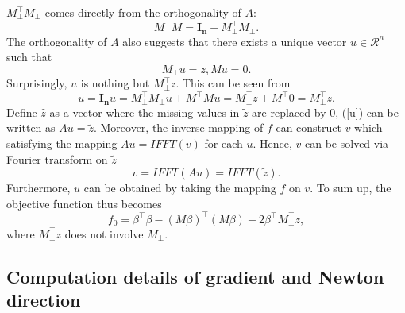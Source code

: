 \documentclass[final,onefignum,onetabnum]{siamart190516}
\begin{document}
$M_{\perp}^{\top}M_{\perp}$ comes directly from the orthogonality of $A$:
\begin{equation}
    M^{\top}M = \mathbf{I_n} -  M_{\perp}^{\top}M_{\perp}.
\end{equation}
The orthogonality of $A$ also suggests that there exists a unique vector $u\in \mathcal{R}^{n}$ such that
\begin{equation}\label{u}
    M_{\perp}u = z, Mu = 0.
\end{equation}
Surprisingly, $u$ is nothing but $M_{\perp}^{\top}z$. This can be seen from
\begin{equation}
    u = \mathbf{I_n}u = M_{\perp}^{\top} M_{\perp}u +  M^{\top}Mu = M_{\perp}^{\top}z + M^{\top}0 = M_{\perp}^{\top}z.
\end{equation}
Define $\widehat{z}$ as a vector where the missing values in $\widetilde{z}$ are replaced by 0, (\ref{u}) can be written as $Au = \widetilde{z}$. Moreover, the inverse mapping of $f$ can construct $v$ which satisfying the mapping $Au = IFFT(v)$ for each $u$. Hence, $v$ can be solved via Fourier transform on $\widetilde{z}$
\begin{equation}
    v = IFFT(Au) = IFFT(\widetilde{z}).
\end{equation}
Furthermore, $u$ can be obtained by taking the mapping $f$ on $v$. To sum up, the objective function thus becomes
\begin{equation}
    f_0 = \beta^{\top}\beta - (M\beta)^{\top}(M\beta) -2\beta^{\top}M_{\perp}^{\top}z,
\end{equation}
where $M_{\perp}^{\top}z$ does not involve $M_{\perp}$.
\subsection{Computation details of gradient and Newton direction}
\end{document}
